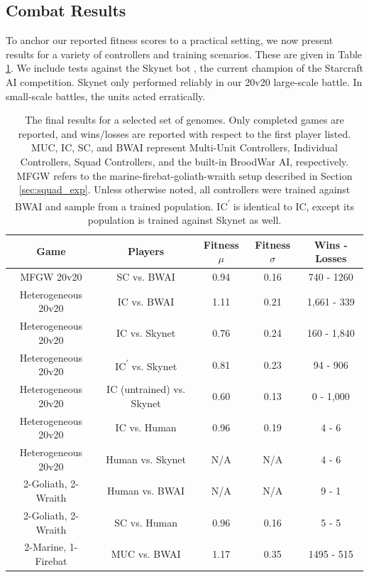 \documentclass[10pt,a4paper,twocolumn]{article}
\begin{document}
\subsection{Combat Results}

To anchor our reported fitness scores to a practical setting, we now present results for a variety of controllers and training scenarios. These are given in Table \ref{tab:results}. We include tests against the Skynet bot \cite{skynet}, the current champion of the Starcraft AI competition. Skynet only performed reliably in our 20v20 large-scale battle. In small-scale battles, the units acted erratically.

\begin{table}
\centering
\begin{tabular}{|c|c|c|c|c|}
	\hline
	{\bf Game} & {\bf Players } & {\bf Fitness $\mu$} & {\bf Fitness $\sigma$} & {\bf Wins - Losses } \\ \hline
	MFGW 20v20 & SC vs. BWAI & 0.94 & 0.16 & 740 - 1260 \\ \hline
	Heterogeneous 20v20 & IC vs. BWAI & 1.11 & 0.21 & 1,661 - 339\\ \hline
	Heterogeneous 20v20 & IC vs. Skynet & 0.76 & 0.24 &  160 - 1,840 \\ \hline
	Heterogeneous 20v20 & IC\textsuperscript{$\prime$} vs. Skynet & 0.81 & 0.23 & 94 - 906 \\ \hline
	Heterogeneous 20v20 & IC (untrained) vs. Skynet & 0.60 & 0.13 & 0 - 1,000 \\ \hline
	Heterogeneous 20v20 & IC vs. Human & 0.96 & 0.19 & 4 - 6 \\ \hline
	Heterogeneous 20v20 & Human vs. Skynet & N/A & N/A & 4 - 6 \\ \hline
	2-Goliath, 2-Wraith & Human vs. BWAI & N/A & N/A & 9 - 1\\ \hline
	2-Goliath, 2-Wraith & SC vs. Human & 0.96 & 0.16 & 5 - 5 \\ \hline
	2-Marine, 1-Firebat & MUC vs. BWAI & 1.17 & 0.35 & 1495 - 515 \\ \hline
\end{tabular}
\caption{The final results for a selected set of genomes. Only completed games are reported, and wins/losses are reported with respect to the first player listed. MUC, IC, SC, and BWAI represent Multi-Unit Controllers, Individual Controllers, Squad Controllers, and the built-in BroodWar AI, respectively. MFGW refers to the marine-firebat-goliath-wraith setup described in Section \ref{sec:squad_exp}. Unless otherwise noted, all controllers were trained against BWAI and sample from a trained population. IC\textsuperscript{$\prime$} is identical to IC, except its population is trained against Skynet as well.}
\label{tab:results}
\end{table}
\end{document}
